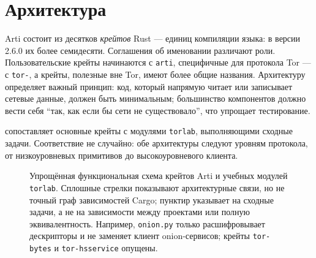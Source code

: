 \section{Архитектура}\label{sec:arti-architettura}

Arti состоит из десятков \emph{крейтов} Rust — единиц компиляции языка: в версии 2.6.0 их более семидесяти. Соглашения об именовании различают роли. Пользовательские крейты начинаются с \texttt{arti}, специфичные для протокола Tor — с \texttt{tor-}, а крейты, полезные вне Tor, имеют более общие названия. Архитектуру определяет важный принцип: код, который напрямую читает или записывает сетевые данные, должен быть минимальным; большинство компонентов должно вести себя \enquote{так, как если бы сети не существовало}, что упрощает тестирование.

 сопоставляет основные крейты с модулями \texttt{torlab}, выполняющими сходные задачи. Соответствие не случайно: обе архитектуры следуют уровням протокола, от низкоуровневых примитивов до высокоуровневого клиента.

\begin{figure}[htbp]
\centering

\caption{Упрощённая функциональная схема крейтов Arti и учебных модулей \texttt{torlab}. Сплошные стрелки показывают архитектурные связи, но не точный граф зависимостей Cargo; пунктир указывает на сходные задачи, а не на зависимости между проектами или полную эквивалентность. Например, \texttt{onion.py} только расшифровывает дескрипторы и не заменяет клиент onion-сервисов; крейты \texttt{tor-bytes} и \texttt{tor-hsservice} опущены.}
\label{fig:crate}
\end{figure}

